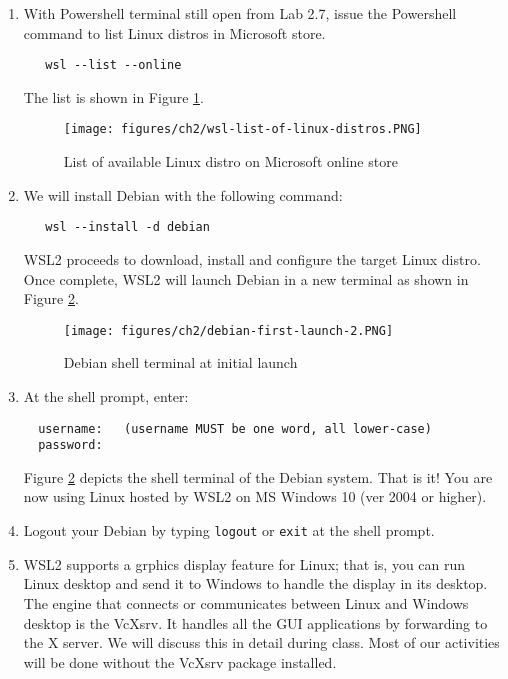 \begin{enumerate}

   \item With Powershell terminal still open from Lab 2.7, issue the Powershell command to list Linux distros in Microsoft store. 
\begin{verbatim}
   wsl --list --online
\end{verbatim}
The list is shown in Figure \ref{fig:online-store}. 
\begin{figure}[hbt!]\centering
\texttt{[image: figures/ch2/wsl-list-of-linux-distros.PNG]}
\caption{List of available Linux distro on Microsoft online store} \label{fig:online-store} %
\end{figure}

\item We will install Debian with the following command: 
\begin{verbatim}
   wsl --install -d debian 
\end{verbatim}
WSL2 proceeds to download, install and configure the target Linux distro. Once complete, WSL2 will launch Debian in a new terminal as shown in Figure \ref{fig:debian-first-launch}.
\begin{figure}[hbt!]\centering
\texttt{[image: figures/ch2/debian-first-launch-2.PNG]}
\caption{Debian shell terminal at initial launch} \label{fig:debian-first-launch} %
\end{figure}

\item At the shell prompt, enter:
\begin{verbatim}
  username:   (username MUST be one word, all lower-case)
  password: 
\end{verbatim} 
Figure \ref{fig:debian-first-launch} depicts the shell terminal of the Debian system. That is it! You are now using Linux hosted by WSL2 on MS Windows 10 (ver 2004 or higher). 

\item Logout your Debian by typing {\tt{logout}} or {\tt{exit}} at the shell prompt. 

\item WSL2 supports a grphics display feature for Linux; that is, you can run Linux desktop and send it to Windows to handle the display in its desktop. The engine that connects or communicates between Linux and Windows desktop is the VcXsrv. It handles all the GUI applications by forwarding to the X server. We will discuss this in detail during class. Most of our activities will be done without the VcXsrv package installed.


\end{enumerate}
